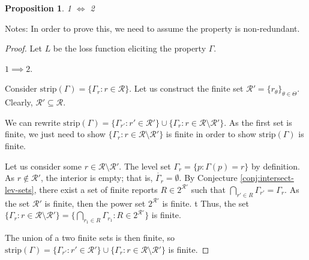 \documentclass[12pt]{article}
\newcommand{\E}{\mathbb{E}}
\newcommand{\R}{\mathcal{R}}
\newcommand{\inter}[1]{\mathring{#1}}%
\newcommand{\strip}{\text{strip}}
\DeclareMathOperator*{\argmin}{arg\,min}
\newtheorem{proposition}{Proposition}
\begin{document}
\begin{proposition}\label{prop:optimal-reports-per-level-set}
1 $\iff$ 2
\end{proposition}



Notes:
In order to prove this, we need to assume the property is non-redundant.


\begin{proof}
Let $L$ be the loss function eliciting the property $\Gamma$.

$1 \implies 2$. 


Consider $\strip(\Gamma) = \{\Gamma_r : r \in \R \}$.
Let us construct the finite set $\R' = \{r_\theta \}_{\theta \in \Theta}$.
Clearly, $\R' \subseteq \R$.

We can rewrite $\strip(\Gamma) = \{\Gamma_{r'} : r' \in \R' \} \cup \{\Gamma_{r} : r \in \R \setminus \R' \}$.
As the first set is finite, we just need to show $\{\Gamma_{r} : r \in \R \setminus \R' \}$ is finite in order to show $\strip(\Gamma)$ is finite.

Let us consider some $r\in\R \setminus \R'$.
The level set $\Gamma_r = \{p : \Gamma(p) = r\}$ by definition.
As $r \not\in \R'$, the interior is empty; that is, $\inter{\Gamma_r} = \emptyset$.
By Conjecture \ref{conj:intersect-lev-sets}, there exist a set of finite reports $R \in 2^{\R'}$ such that $\bigcap_{r'\in R} \Gamma_{r'} = \Gamma_r$.
As the set $\R'$ is finite, then the power set $2^{\R'}$ is finite. t
Thus, the set $\{ \Gamma_r : r \in \R \setminus \R' \} =  \{ \bigcap_{r_1 \in R} \Gamma_{r_1} : R \in 2^{\R'} \}$ is finite.


The union of a two finite sets is then finite, so $\strip(\Gamma) = \{ \Gamma_{r'} : r' \in \R' \} \cup \{ \Gamma_r : r \in \R \setminus \R' \}$ is finite.





\end{proof}
\end{document}
